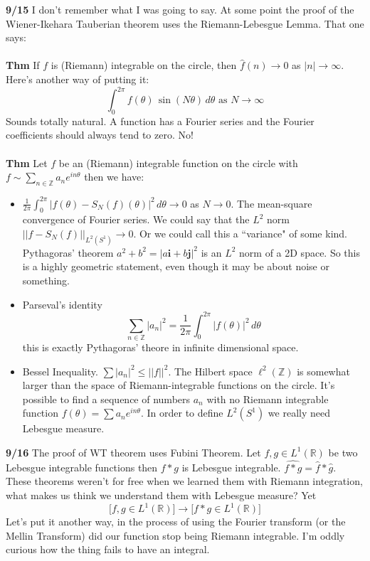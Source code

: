 \documentclass[12pt]{article}
\begin{document}
\noindent \textbf{9/15} I don't remember what I was going to say.  At some point the proof of the Wiener-Ikehara Tauberian theorem uses the Riemann-Lebesgue Lemma.  That one says: \\ \\
\textbf{Thm} If $f$ is (Riemann) integrable on the circle, then $\hat{f}(n) \to 0$ as $|n| \to \infty$. Here's another way of putting it:
$$ \int_0^{2\pi} f(\theta) \, \sin (N\theta) \, d\theta \text{ as } N \to \infty $$
Sounds totally natural.  A function has a Fourier series and the Fourier coefficients should always tend to zero.  No!  \\ \\
\textbf{Thm} Let $f$ be an (Riemann) integrable function on the circle with $f \sim \sum_{n \in \mathbb{Z}} a_n e^{in\theta}$ then we have:
\begin{itemize}
\item $\displaystyle \frac{1}{2\pi}\int_0^{2\pi} | f(\theta) - S_N(f)(\theta)|^2 \, d\theta \to 0 $ as $N \to 0$.  The mean-square convergence of Fourier series.   We could say that the $L^2$ norm $||f - S_N(f)||_{L^2(S^1)} \to 0$.  Or we could call this a ``variance" of some kind.  Pythagoras' theorem $a^2 + b^2 = |a \mathbf{i} + b \mathbf{j}|^2$ is an $L^2$ norm of a 2D space.  So this is a highly geometric statement, even though it may be about noise or something.
\item Parseval's identity
$$ \sum_{n \in \mathbb{Z}} |a_n|^2 = \frac{1}{2\pi}\int_0^{2\pi} |f(\theta)|^2 \, d\theta $$
this is exactly Pythagoras' theore in infinite dimensional space.
\item Bessel Inequality.  $ \sum |a_n|^2 \leq ||f||^2$.  The Hilbert space $\ell^2(\mathbb{Z})$ is somewhat larger than the space of Riemann-integrable functions on the circle.   It's possible to find a sequence of numbers $a_n$ with no Riemann integrable function $f(\theta) = \sum a_n e^{in\theta}$. In order to define $L^2(S^1)$ we really need Lebesgue measure. 
\end{itemize} 
\textbf{9/16} The proof of WT theorem uses Fubini Theorem.  Let $f, g \in L^1(\mathbb{R})$ be two Lebesgue integrable functions then $f*g$ is Lebesgue integrable.  $\widehat{f*g}= \widehat{f}*\widehat{g}$.  These theorems weren't for free when we learned them with Riemann integration, what makes us think we understand them with Lebesgue measure?  Yet
$$ \Big[ f, g \in L^1(\mathbb{R}) \Big] \to \Big[ f * g \in L^1(\mathbb{R}) \Big] $$
Let's put it another way, in the process of using the Fourier transform (or the Mellin Transform) did our function stop being Riemann integrable.  I'm oddly curious how the thing fails to have an integral. \\ \\
\end{document}
